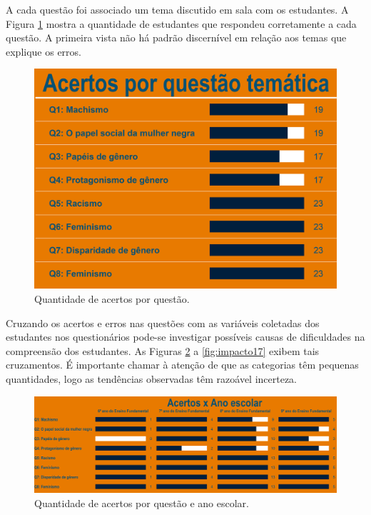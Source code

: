 \documentclass[
]{book}
\begin{document}
A cada questão foi associado um tema discutido em sala com os estudantes. A Figura \ref{fig:impacto12} mostra a quantidade de estudantes que respondeu corretamente a cada questão. A primeira vista não há padrão discernível em relação aos temas que explique os erros.

\begin{figure}

{\centering \includegraphics[width=0.75\linewidth,height=0.75\textheight]{images/Impactos/12} 

}

\caption{Quantidade de acertos por questão.}\label{fig:impacto12}
\end{figure}

Cruzando os acertos e erros nas questões com as variáveis coletadas dos estudantes nos questionários pode-se investigar possíveis causas de dificuldades na compreensão dos estudantes. As Figuras \ref{fig:impacto13} a \ref{fig:impacto17} exibem tais cruzamentos. É importante chamar à atenção de que as categorias têm pequenas quantidades, logo as tendências observadas têm razoável incerteza.

\begin{figure}

{\centering \includegraphics[width=0.75\linewidth,height=0.75\textheight]{images/Impactos/13} 

}

\caption{Quantidade de acertos por questão e ano escolar.}\label{fig:impacto13}
\end{figure}
\end{document}
